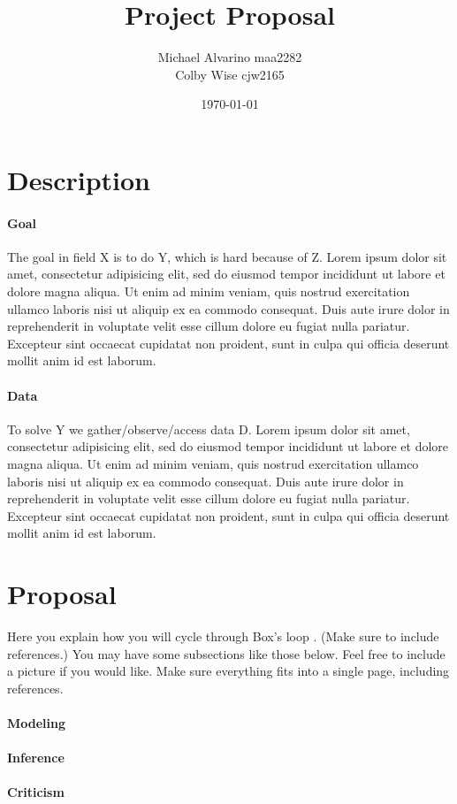\documentclass{article}
\begin{document}
\title{\textbf{Project Proposal}}
\date{\today}
\author{
Michael Alvarino maa2282\\
Colby Wise cjw2165
}

\maketitle

\section{Description}

\paragraph{Goal} The goal in field X is to do Y, which is hard because of Z.
Lorem ipsum dolor sit amet, consectetur adipisicing elit, sed do eiusmod
tempor incididunt ut labore et dolore magna aliqua. Ut enim ad minim veniam,
quis nostrud exercitation ullamco laboris nisi ut aliquip ex ea commodo
consequat. Duis aute irure dolor in reprehenderit in voluptate velit esse
cillum dolore eu fugiat nulla pariatur. Excepteur sint occaecat cupidatat non
proident, sunt in culpa qui officia deserunt mollit anim id est laborum.

\paragraph{Data} To solve Y we gather/observe/access data D.
Lorem ipsum dolor sit amet, consectetur adipisicing elit, sed do eiusmod
tempor incididunt ut labore et dolore magna aliqua. Ut enim ad minim veniam,
quis nostrud exercitation ullamco laboris nisi ut aliquip ex ea commodo
consequat. Duis aute irure dolor in reprehenderit in voluptate velit esse
cillum dolore eu fugiat nulla pariatur. Excepteur sint occaecat cupidatat non
proident, sunt in culpa qui officia deserunt mollit anim id est laborum.

\section{Proposal}

Here you explain how you will cycle through Box's loop \citep{box1976science}.
(Make sure to include references.) You may have some subsections like those
below. Feel free to include a picture if you would like. Make sure everything
fits into a single page, including references.

\paragraph{Modeling}

\paragraph{Inference}

\paragraph{Criticism}




\end{document}
